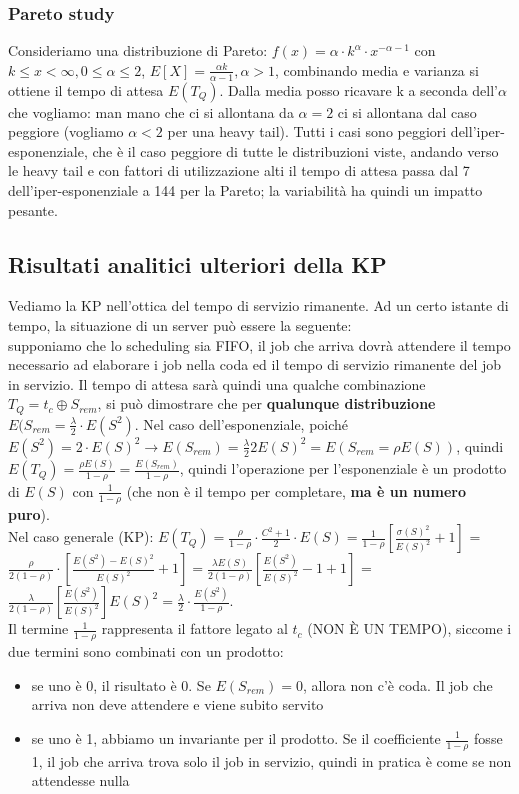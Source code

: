 \documentclass{article}
\begin{document}
\subsubsection{Pareto study}
Consideriamo una distribuzione di Pareto: $f(x) = \alpha \cdot k^{\alpha} \cdot x^{-\alpha-1}$ con $k \leq x < \infty, 0 \leq \alpha \leq 2$, $E[X] = \frac{\alpha k}{\alpha - 1}, \alpha > 1$, combinando media e varianza si ottiene il tempo di attesa $E(T_Q)$. Dalla media posso ricavare k a seconda dell'$\alpha$ che vogliamo: man mano che ci si allontana da $\alpha = 2$ ci si allontana dal caso peggiore (vogliamo $\alpha < 2$ per una heavy tail). Tutti i casi sono peggiori dell'iper-esponenziale, che è il caso peggiore di tutte le distribuzioni viste, andando verso le heavy tail e con fattori di utilizzazione alti il tempo di attesa passa dal 7 dell'iper-esponenziale a 144 per la Pareto; la variabilità ha quindi un impatto pesante.
\subsection{Risultati analitici ulteriori della KP}
Vediamo la KP nell'ottica del tempo di servizio rimanente. Ad un certo istante di tempo, la situazione di un server può essere la seguente:\\
supponiamo che lo scheduling sia FIFO, il job che arriva dovrà attendere il tempo necessario ad elaborare i job nella coda ed il tempo di servizio rimanente del job in servizio. Il tempo di attesa sarà quindi una qualche combinazione $T_Q = t_c \oplus S_{rem}$, si può dimostrare che per \textbf{qualunque distribuzione} $E(S_{rem} = \frac{\lambda}{2}\cdot E(S^2)$. Nel caso dell'esponenziale, poiché $E(S^2) = 2\cdot E(S)^2 \rightarrow E(S_{rem}) = \frac{\lambda}{2}2E(S)^2 = E(S_{rem} = \rho E(S))$, quindi $E(T_Q) = \frac{\rho E(S)}{1 - \rho} = \frac{E(S_{rem})}{1 - \rho}$, quindi l'operazione per l'esponenziale è un prodotto di $E(S)$ con $\frac{1}{1 - \rho}$ (che non è il tempo per completare, \textbf{ma è un numero puro}).\\ Nel caso generale (KP): $E(T_Q) = \frac{\rho}{1 - \rho} \cdot \frac{C^2 + 1}{2}\cdot E(S) = \frac{1}{1 - \rho} [\frac{\sigma(S)^2}{E(S)^2} + 1]$ = $\frac{\rho}{2(1 - \rho)}\cdot[\frac{E(S^2) - E(S)^2}{E(S)^2} + 1] = \frac{\lambda E(S)}{2(1 - \rho)}[\frac{E(S^2)}{E(S)^2} - 1 + 1]$ = $\frac{\lambda}{2(1 - \rho)}[\frac{E(S^2)}{E(S)^2}]E(S)^2 = \frac{\lambda}{2}\cdot \frac{E(S^2)}{1 - \rho}$.\\ Il termine $\frac{1}{1 - \rho}$ rappresenta il fattore legato al $t_c$ (NON È UN TEMPO), siccome i due termini sono combinati con un prodotto:
\begin{itemize}
\item se uno è 0, il risultato è 0. Se $E(S_{rem}) = 0$, allora non c'è coda. Il job che arriva non deve attendere e viene subito servito
\item se uno è 1, abbiamo un invariante per il prodotto. Se il coefficiente $\frac{1}{1 - \rho}$ fosse 1, il job che arriva trova solo il job in servizio, quindi in pratica è come se non attendesse nulla
\end{itemize}
\end{document}
